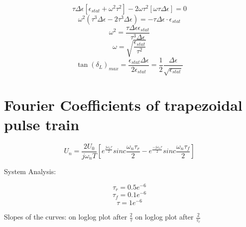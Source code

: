 \begin{equation}
\tau \Delta \epsilon [\epsilon_{stat} + \omega^2 \tau^2] -2\omega \tau^2 [\omega \tau \Delta \epsilon] = 0
\end{equation}
\begin{equation}
\omega^2 (\tau^3 \Delta \epsilon -2 \tau^3 \Delta \epsilon) = - \tau \Delta \epsilon \cdot \epsilon_{stat}
\end{equation}
\begin{equation}
\omega^2 = \frac{\tau \Delta \epsilon \epsilon_{stat}}{\tau^3 \Delta \epsilon}
\end{equation}
\begin{equation}
\omega = \sqrt{\frac{\epsilon_{stat}}{\tau^2}}
\end{equation}
\begin{equation}
\tan(\delta_L)_{max} = \frac{\epsilon_{stat} \Delta\epsilon}{2\epsilon_{stat}} = \frac{1}{2} \frac{\Delta \epsilon}{\sqrt{\epsilon_{stat}}}
\end{equation}


\section{Fourier Coefficients of trapezoidal pulse  train }


\begin{equation}
 U_n = \frac{2 U_0}{j \omega_n T} [e^{\frac{j \omega_n \tau}{2}} sinc{\frac { \omega_n \tau_r }{2}} -e^{\frac{-j \omega_n \tau}{2}} sinc{\frac{ \omega_n \tau_f}{2}}]
\end{equation}
 
System Analysis: 
 
 
\begin{equation}
 \tau_r = 0.5e^{-6 }
  \end{equation}
  \begin{equation}
 \tau_f = 0.1e^{-6}
  \end{equation}
 \begin{equation}
\tau= 1e^{-6}
 \end{equation}
 
Slopes of the curves:  on loglog plot after $\frac{2}{\tau}$  on loglog plot after $\frac{2}{\tau_r}$



	
